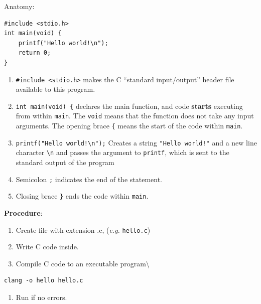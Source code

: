 \documentclass[11pt,a4paper]{article}
\providecommand{\tightlist}{\setlength{\itemsep}{0pt}\setlength{\parskip}{0pt}}
\begin{document}
\label{01-basic-program}
\hypertarget{01-basic-program}{}

Anatomy:

\begin{lstlisting}[style=cscode]
#include <stdio.h>
int main(void) {
    printf("Hello world!\n");
    return 0;
}
\end{lstlisting}

\begin{enumerate}
\def\labelenumi{\arabic{enumi}.}
\tightlist
\item
  \texttt{\#include\ \textless{}stdio.h\textgreater{}} makes the C ``standard input/output'' header file available to this program.
\item
  \texttt{int\ main(void)\ \{} declares the main function, and code \textbf{starts} executing from within \texttt{main}. The \texttt{void} means that the function does not take any input arguments. The opening brace \texttt{\{} means the start of the code within \texttt{main}.
\item
  \texttt{printf("Hello\ world!\textbackslash{}n");} Creates a string \texttt{"Hello\ world!"} and a new line character \texttt{\textbackslash{}n} and passes the argument to \texttt{printf}, which is sent to the standard output of the program
\item
  Semicolon \texttt{;} indicates the end of the statement.
\item
  Closing brace \texttt{\}} ends the code within \texttt{main}.
\end{enumerate}

\textbf{Procedure}:

\begin{enumerate}
\def\labelenumi{\arabic{enumi}.}
\tightlist
\item
  Create file with extension .c, (\emph{e.g.} \texttt{hello.c})
\item
  Write C code inside.
\item
  Compile C code to an executable program\textbackslash{}
\end{enumerate}

\begin{lstlisting}[style=shellcode]
clang -o hello hello.c
\end{lstlisting}

\begin{enumerate}
\def\labelenumi{\arabic{enumi}.}
\setcounter{enumi}{3}
\tightlist
\item
  Run if no errors.
\end{enumerate}
\end{document}
